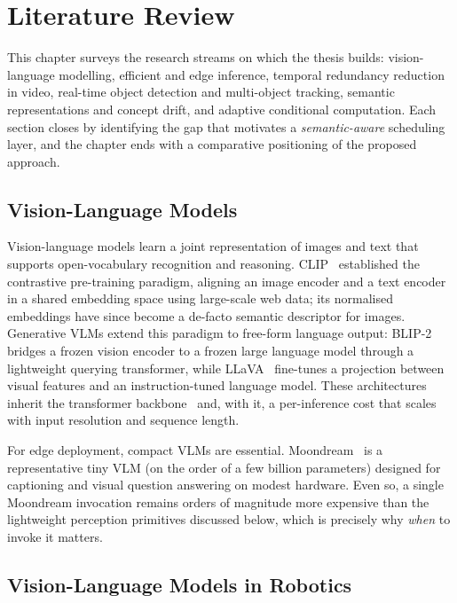 \chapter{Literature Review}
\label{ch:literature}

\begin{chapterabstract}
This chapter surveys the research streams on which the thesis builds:
vision-language modelling, efficient and edge inference, temporal redundancy
reduction in video, real-time object detection and multi-object tracking,
semantic representations and concept drift, and adaptive conditional
computation. Each section closes by identifying the gap that motivates a
\emph{semantic-aware} scheduling layer, and the chapter ends with a
comparative positioning of the proposed approach.
\end{chapterabstract}

\section{Vision-Language Models}
\label{sec:lit-vlm}

Vision-language models learn a joint representation of images and text that
supports open-vocabulary recognition and reasoning. CLIP~\cite{Radford2021CLIP}
established the contrastive pre-training paradigm, aligning an image encoder
and a text encoder in a shared embedding space using large-scale web data; its
normalised embeddings have since become a de-facto semantic descriptor for
images. Generative VLMs extend this paradigm to free-form language output:
BLIP-2~\cite{Li2023BLIP2} bridges a frozen vision encoder to a frozen large
language model through a lightweight querying transformer, while
LLaVA~\cite{Liu2023LLaVA} fine-tunes a projection between visual features and
an instruction-tuned language model. These architectures inherit the
transformer backbone~\cite{Vaswani2017Attention,Dosovitskiy2021ViT} and, with
it, a per-inference cost that scales with input resolution and sequence
length.

For edge deployment, compact VLMs are essential. Moondream~\cite{Moondream2024}
is a representative tiny VLM (on the order of a few billion parameters)
designed for captioning and visual question answering on modest hardware. Even
so, a single Moondream invocation remains orders of magnitude more expensive
than the lightweight perception primitives discussed below, which is precisely
why \emph{when} to invoke it matters.

\section{Vision-Language Models in Robotics}
\label{sec:lit-robotics}

